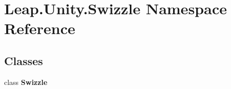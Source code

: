 \hypertarget{namespace_leap_1_1_unity_1_1_swizzle}{}\section{Leap.\+Unity.\+Swizzle Namespace Reference}
\label{namespace_leap_1_1_unity_1_1_swizzle}
\subsection*{Classes}
\begin{DoxyCompactItemize}
\item 
class {\bfseries Swizzle}
\end{DoxyCompactItemize}
